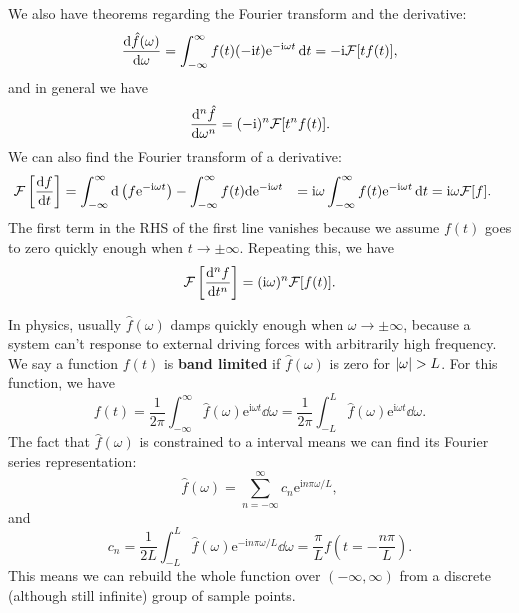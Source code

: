 \documentclass[hyperref, a4paper]{article}
\newcommand*{\ii}{\mathrm{i}}
\newcommand*{\ee}{\mathrm{e}}
\newcommand*{\concept}[1]{{\textbf{#1}}}
\def\\{}%
\newcommand*{\fourier}{\mathcal{F}}
\newcommand*{\inftoinf}{\int_{-\infty}^{\infty}}
\begin{document}
We also have theorems regarding the Fourier transform
and the derivative: 
\begin{equation}
    \dv{\hat{f}(\omega)}{\omega} = 
    \inftoinf f(t) (- \ii t) \ee^{- \ii \omega t} \dd{t} 
    = - \ii \fourier[t f(t)],
\end{equation}
and in general we have 
\begin{equation}
    \dv[n]{\hat{f}}{\omega} = (- \ii)^n \fourier[t^n f(t)].
\end{equation}
We can also find the Fourier transform
of a derivative: 
\begin{equation}
    \begin{aligned}
        \fourier\left[
            \dv{f}{t}
        \right] &= 
        \int_{-\infty}^{\infty} \dd \left( f \ee^{- \ii \omega t} \right) 
        - \inftoinf f(t) \dd \ee^{- \ii \omega t} \\
        &= \ii \omega \inftoinf f(t) \ee^{- \ii \omega t} \dd{t} \\
        &= \ii \omega \fourier[f].
    \end{aligned}
\end{equation}
The first term in the RHS of the first line vanishes
because we assume $f(t)$ goes to zero quickly enough 
when $t \to \pm \infty$.
Repeating this, we have 
\begin{equation}
    \fourier\left[\dv[n]{f}{t}\right] = 
    (\ii \omega)^n \fourier[f(t)].
\end{equation}

In physics, usually $\hat{f}(\omega)$ damps quickly enough when $\omega \to \pm \infty$,
because a system can't response to external driving forces with arbitrarily high frequency.
We say a function $f(t)$ is \concept{band limited} if 
$\hat{f}(\omega)$ is zero for $\abs{\omega} > L$.
For this function, we have 
\begin{equation}
    f(t) = \frac{1}{2\pi} \inftoinf \hat{f}(\omega) \ee^{\ii \omega t} \dd{\omega}
    = \frac{1}{2\pi} \int_{-L}^{L} \hat{f}(\omega) \ee^{\ii \omega t} \dd{\omega}.
\end{equation}
The fact that $\hat{f}(\omega)$ is constrained to a interval 
means we can find its Fourier series representation:
\begin{equation}
    \hat{f}(\omega) = \sum_{n = -\infty}^{\infty}
    c_n \ee^{\ii n \pi \omega / L},
\end{equation}
and 
\begin{equation}
    c_n = \frac{1}{2L} \int_{-L}^{L} \hat{f}(\omega) \ee^{- \ii n \pi \omega / L} \dd{\omega}
    = \frac{\pi}{L} f\left(
        t = - \frac{n \pi}{L}
    \right).
\end{equation}
This means we can rebuild the whole function over $(-\infty, \infty)$
from a discrete (although still infinite) group of sample points.
\end{document}
